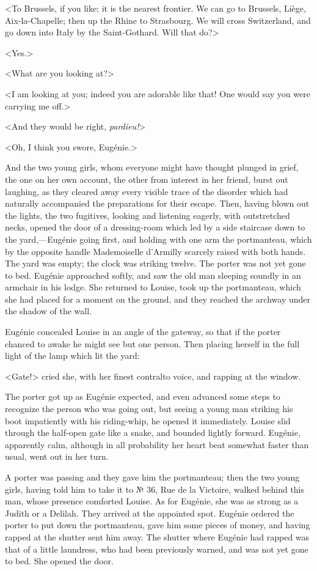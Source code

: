 <To Brussels, if you like; it is the nearest frontier. We can go to Brussels, Liège, Aix-la-Chapelle; then up the Rhine to Strasbourg. We will cross Switzerland, and go down into Italy by the Saint-Gothard. Will that do?> 

 <Yes.> 

 <What are you looking at?> 

 <I am looking at you; indeed you are adorable like that! One would say you were carrying me off.> 

 <And they would be right, \textit{pardieu!}> 

 <Oh, I think you swore, Eugénie.> 

 And the two young girls, whom everyone might have thought plunged in grief, the one on her own account, the other from interest in her friend, burst out laughing, as they cleared away every visible trace of the disorder which had naturally accompanied the preparations for their escape. Then, having blown out the lights, the two fugitives, looking and listening eagerly, with outstretched necks, opened the door of a dressing-room which led by a side staircase down to the yard,—Eugénie going first, and holding with one arm the portmanteau, which by the opposite handle Mademoiselle d'Armilly scarcely raised with both hands. The yard was empty; the clock was striking twelve. The porter was not yet gone to bed. Eugénie approached softly, and saw the old man sleeping soundly in an armchair in his lodge. She returned to Louise, took up the portmanteau, which she had placed for a moment on the ground, and they reached the archway under the shadow of the wall. 

 Eugénie concealed Louise in an angle of the gateway, so that if the porter chanced to awake he might see but one person. Then placing herself in the full light of the lamp which lit the yard: 

 <Gate!> cried she, with her finest contralto voice, and rapping at the window. 

 The porter got up as Eugénie expected, and even advanced some steps to recognize the person who was going out, but seeing a young man striking his boot impatiently with his riding-whip, he opened it immediately. Louise slid through the half-open gate like a snake, and bounded lightly forward. Eugénie, apparently calm, although in all probability her heart beat somewhat faster than usual, went out in her turn. 

 A porter was passing and they gave him the portmanteau; then the two young girls, having told him to take it to № 36, Rue de la Victoire, walked behind this man, whose presence comforted Louise. As for Eugénie, she was as strong as a Judith or a Delilah. They arrived at the appointed spot. Eugénie ordered the porter to put down the portmanteau, gave him some pieces of money, and having rapped at the shutter sent him away. The shutter where Eugénie had rapped was that of a little laundress, who had been previously warned, and was not yet gone to bed. She opened the door. 

